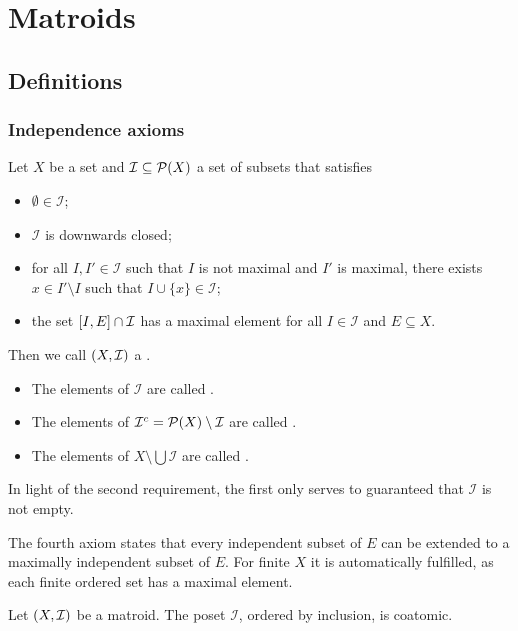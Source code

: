 \chapter{Matroids}
\section{Definitions}
\subsection{Independence axioms}
\begin{definition}
Let $X$ be a set and $\mathcal{I} \subseteq \operatorname{\mathcal{P}}(X)$ a set of subsets that satisfies
\begin{itemize}
\item $\emptyset\in \mathcal{I}$;
\item $\mathcal{I}$ is downwards closed;
\item for all $I, I'\in \mathcal{I}$ such that $I$ is not maximal and $I'$ is maximal, there exists $x\in I'\setminus I$ such that $I\cup \{x\}\in \mathcal{I}$;
\item the set $\interval{I, E}\cap \mathcal{I}$ has a maximal element for all $I\in \mathcal{I}$ and $E\subseteq X$. 
\end{itemize}
Then we call $\sSet{X, \mathcal{I}}$ a .
\begin{itemize}
\item The elements of $\mathcal{I}$ are called .
\item The elements of $\mathcal{I}^c = \operatorname{\mathcal{P}}(X)\setminus \mathcal{I}$ are called .
\item The elements of $X\setminus \bigcup \mathcal{I}$ are called .
\end{itemize}
\end{definition}
In light of the second requirement, the first only serves to guaranteed that $\mathcal{I}$ is not empty.

The fourth axiom states that every independent subset of $E$ can be extended to a maximally independent subset of $E$. For finite $X$ it is automatically fulfilled, as each finite ordered set has a maximal element. 


\begin{lemma}
Let $\sSet{X, \mathcal{I}}$ be a matroid. The poset $\mathcal{I}$, ordered by inclusion, is coatomic.
\end{lemma}


